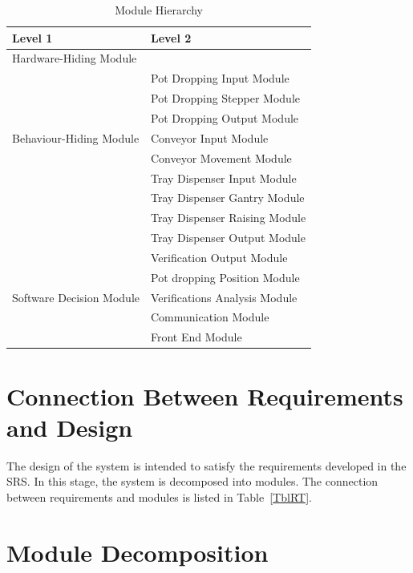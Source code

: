 \documentclass[12pt, titlepage]{article}
\begin{document}
\begin{table}[h!]
\centering
\begin{tabular}{p{} p{}}
\toprule
\textbf{Level 1} & \textbf{Level 2}\\
\midrule

{Hardware-Hiding Module} & ~ \\
\midrule

\multirow{7}{0.3\textwidth}{Behaviour-Hiding Module}
& Pot Dropping Input Module \\
& Pot Dropping Stepper Module\\
& Pot Dropping Output Module\\
& Conveyor Input Module\\
& Conveyor Movement Module\\
& Tray Dispenser Input Module\\ 
& Tray Dispenser Gantry Module\\
& Tray Dispenser Raising Module \\
& Tray Dispenser Output Module \\
& Verification Output Module \\

\midrule

\multirow{3}{0.3\textwidth}{Software Decision Module}
& Pot dropping Position Module\\
& Verifications Analysis Module\\
& Communication Module\\
& Front End Module\\
\bottomrule

\end{tabular}
\caption{Module Hierarchy}
\label{TblMH}
\end{table}

\section{Connection Between Requirements and Design} \label{SecConnection}

The design of the system is intended to satisfy the requirements developed in
the SRS. In this stage, the system is decomposed into modules. The connection
between requirements and modules is listed in Table~\ref{TblRT}.

\section{Module Decomposition} \label{SecMD}
\end{document}
